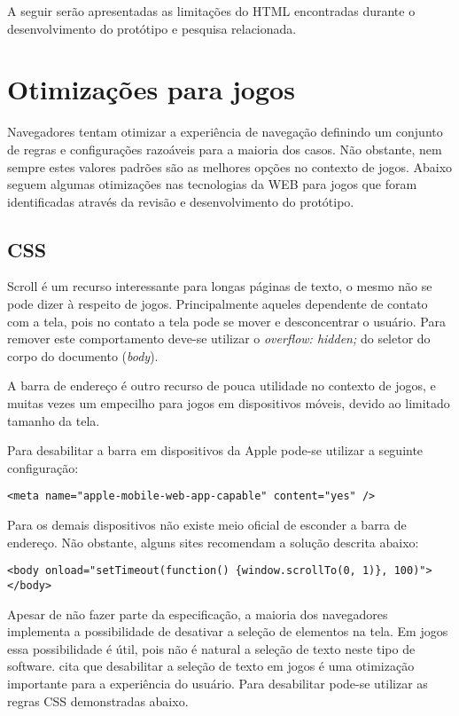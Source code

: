 A seguir serão apresentadas as limitações do HTML encontradas durante
o desenvolvimento do protótipo e pesquisa relacionada.

\section{Otimizações para jogos}
Navegadores tentam otimizar a experiência de navegação definindo
um conjunto de regras e configurações razoáveis para a maioria dos
casos. Não obstante, nem sempre estes valores padrões são as melhores
opções no contexto de jogos. Abaixo seguem algumas otimizações nas tecnologias da WEB para jogos que foram identificadas através da revisão e desenvolvimento do protótipo.

\subsection{CSS}

Scroll é um recurso interessante para longas páginas de texto,
o mesmo não se pode dizer à respeito de jogos.
Principalmente aqueles dependente de contato com a tela, pois
no contato a tela pode se mover e desconcentrar o usuário. Para
remover este comportamento deve-se utilizar o \textit{overflow:
hidden;} do seletor do corpo do documento (\textit{body}).

A barra de endereço é outro recurso de pouca utilidade no contexto de
jogos, e muitas vezes um empecilho para jogos em dispositivos móveis,
devido ao limitado tamanho da tela.

Para desabilitar a barra em dispositivos da Apple pode-se utilizar a
seguinte configuração:

\begin{verbatim}
<meta name="apple-mobile-web-app-capable" content="yes" />
\end{verbatim}

Para os demais dispositivos não existe meio oficial de esconder a barra
de endereço. Não obstante, alguns sites recomendam a solução descrita abaixo:

\begin{verbatim}
<body onload="setTimeout(function() {window.scrollTo(0, 1)}, 100)">
</body>
\end{verbatim}

Apesar de não fazer parte da especificação, a maioria dos navegadores
implementa a possibilidade de desativar a seleção de elementos na tela.
Em jogos essa possibilidade é útil, pois não é natural a seleção de texto
neste tipo de software. \cite{html5mostwanted} cita que desabilitar
a seleção de texto em jogos é uma otimização importante para a
experiência do usuário. Para desabilitar pode-se utilizar as regras
CSS demonstradas abaixo.

